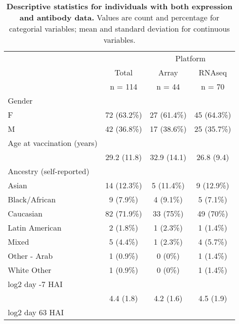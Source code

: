 \begin{table}[ ht! ] 
 \centering 
 \caption{\textbf{Descriptive statistics for individuals with both expression and antibody data.} Values are count and percentage for categorial variables; mean and standard deviation for continuous variables.}\label{tab:hird_table1}
 \begin{tabular}{ l c c c }
 \toprule
  &   &  \multicolumn{ 2 }{c}{ Platform }\\ 
  & Total & Array & \gls{RNAseq} \\ 
  & n = 114 & n = 44 & n = 70 \\ 
  \midrule
 Gender &   &   &  \\ 
 \hspace{6pt}    F & 72 (63.2\%) & 27 (61.4\%) & 45 (64.3\%)\\ 
 \hspace{6pt}    M & 42 (36.8\%) & 17 (38.6\%) & 25 (35.7\%)\\ 
 Age at vaccination (years)  &   &   &  \\ 
 \hspace{6pt}   & 29.2 (11.8) & 32.9 (14.1) & 26.8 (9.4)\\ 
 Ancestry (self-reported) &   &   &  \\ 
 \hspace{6pt}    Asian & 14 (12.3\%) & 5 (11.4\%) & 9 (12.9\%)\\ 
 \hspace{6pt}    Black/African & 9 (7.9\%) & 4 (9.1\%) & 5 (7.1\%)\\ 
 \hspace{6pt}    Caucasian & 82 (71.9\%) & 33 (75\%) & 49 (70\%)\\ 
 \hspace{6pt}    Latin American & 2 (1.8\%) & 1 (2.3\%) & 1 (1.4\%)\\ 
 \hspace{6pt}    Mixed & 5 (4.4\%) & 1 (2.3\%) & 4 (5.7\%)\\ 
 \hspace{6pt}    Other - Arab & 1 (0.9\%) & 0 (0\%) & 1 (1.4\%)\\ 
 \hspace{6pt}    White Other & 1 (0.9\%) & 0 (0\%) & 1 (1.4\%)\\ 
 log2 day -7 HAI  &   &   &  \\ 
 \hspace{6pt}   & 4.4 (1.8) & 4.2 (1.6) & 4.5 (1.9)\\ 
 log2 day 63 HAI  &   &   &  \\ 

\end{tabular}
\end{table}
